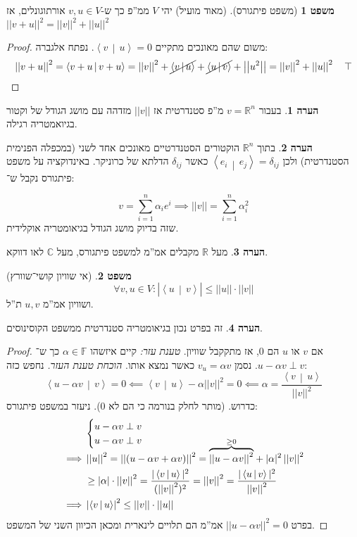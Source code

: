 \documentclass[a4paper]{article}
\newcommand\R     {\mathbb{R}}
\newcommand\C     {\mathbb{C}}
\newcommand\ra    {\rangle}
\newcommand\la    {\langle}
\newcommand\F         {\mathbb{F}}
\newcommand\co        {\colon}
\newcommand\norm[1]   {\left \vert \left \vert #1 \right \vert \right \vert}
\newcommand\mut [2]   {\left \la #1 \,\middle\vert\, #2 \right \ra}
\newcommand\ag        {\alpha}
\newcommand\sof[1]    {\left | #1 \right |}
\newcommand\dequad    {\!\!\!\!\!\!}
\theoremstyle{definition}
\newtheorem{Theorem}{\color{myblue}משפט}
\newtheorem{Remark}{\color{mycyan}הערה}
\newcommand\theo  [1] {\begin{Theorem}#1\end{Theorem}}
\newcommand\rmark [1] {\begin{Remark}#1\end{Remark}}
\begin{document}
	\begin{Theorem}[משפט פיתגורס]
		(מאוד מועיל) יהי $V$ ממ''פ כך ש-$v, u \in V$ אורתוגונלים, אז $\norm{v + u}^2 = \norm{v}^2 + \norm{u}^2$
	\end{Theorem}\begin{proof} משום שהם מאונכים מתקיים $\mut{v}{u} = 0$. נפתח אלגברה: 
		\[ \norm{v + u}^2 = \mut{v + u}{v + u} = \norm{v}^2 + \cancel{\mut{v}{u}} + \cancel{\mut{u}{v}} + \norm{u^2} = \norm{v}^2 + \norm{u}^2 \quad \top \]
	\end{proof}
	
	\rmark{בעבור $v = \R^n$ מ''פ סטנדרטית אז $\norm{v}$ מזדהה עם מושג הגודל של וקטור בגיואמטריה רגילה. }
	
	\rmark{בתוך $\R^n$ הוקטורים הסטנדרטיים מאונכים אחד לשני (במכפלה הפנימית הסטנדרטית) ולכן $\mut{e_i}{e_j} = \delta_{ij}$ כאשר $\delta_{ij}$ הדלתא של כרוניקר. באינדוקציה על משפט פיתגורס נקבל ש־: }
	
	\[ v = \sum_{i = 1}^{n}\ag_i e^i \implies \norm{v} = \sum_{i = 1}^{n}\ag_i^2 \]
	שזה בדיוק מושג הגודל בגיאומטריה אוקלידית. 
	
	\rmark{מעל $\R$ מקבלים אמ''מ למשפט פיתגורס, מעל $\C$ לאו דווקא. }
	
	\theo{(אי שוויון קושי־שוורץ)
		\[ \forall v, u \in V \co \sof{\mut{u}{v}} \le \norm{u}\cdot\norm{v} \]
		ושוויון אמ''מ $u, v$ ת''ל. }
	\rmark{זה בפרט נכון בגיאומטריה סטנדרטית ממשפט הקוסינוסים. }
	
	\begin{proof}
		אם $v$ או $u$ הם $0$, אז מתקקבל שוויון. 
		\textit{טענת עזר: }קיים איזשהו $\ag \in \F$ כך ש־$u - \ag v \perp v$. נסמן $v_u = \ag v$ כאשר נמצא אותו. 
		\textit{הוכחת טענת העזר. }נחפש כזה: 
		\[ \mut{u - \ag v}{v} = 0 \impliedby \mut{v}{u} - \ag \norm{v}^2 = 0 \impliedby \ag = \frac{\mut{v}{u}}{\norm{v}^2} \]
		כדרוש. (מותר לחלק בנורמה כי הם לא $0$). ניעזר במשפט פיתגורס: 
		\begin{align*}
			&\begin{cases}
				u - \ag v \perp v \\ u - \ag v \perp v
			\end{cases}\dequad  \\
			\implies &\norm{u}^2 = \norm{(u - \ag v + \ag v)}^2 = \smash{\overbrace{\norm{u - \ag v}^2}^{\ge 0}} + |\ag|^2\norm{v}^2 \\ 
				&\ge |\ag|\cdot\norm{v}^2 = \frac{|\mut{v}{u}|^2}{(\norm{v}^2)^2} = \norm{v}^2 = \frac{|\mut{u}{v}|^2}{\norm{v}^2} \\
			\implies &\sof{\mut{v}{u}}^2 \le \norm{v} \cdot \norm{u}
		\end{align*}
		בפרט $\norm{u - \ag v}^2 = 0$ אמ''מ הם תלויים לינארית ומכאן הכיוון השני של המשפט. 
	\end{proof}
	
\end{document}
